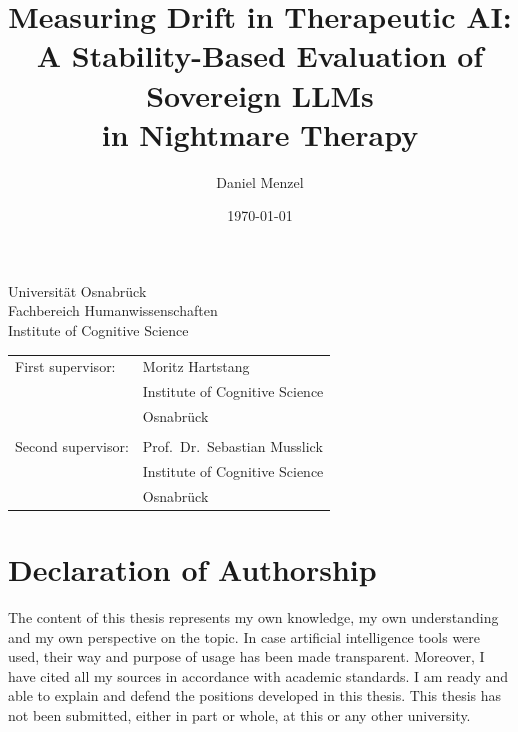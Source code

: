 \documentclass[11pt,
  paper=a4,
  bibliography=totocnumbered,
  captions=tableheading,
  BCOR=10mm
]{scrreprt}
\title{Measuring Drift in Therapeutic AI:\\A Stability-Based Evaluation of Sovereign LLMs\\in Nightmare Therapy}
\author{Daniel Menzel}
\date{\today}
\begin{document}
\begin{titlepage}
  \begin{flushleft}
    Universit\"at Osnabr\"uck\\
    Fachbereich Humanwissenschaften\\
    Institute of Cognitive Science
  \end{flushleft}

  \vspace{2cm}
  \vspace{1cm}

  \begin{tabular}{ll}
    First supervisor:  & Moritz Hartstang                \\
                       & Institute of Cognitive Science  \\
                       & Osnabr\"uck                     \\\\
    Second supervisor: & Prof.\ Dr.\ Sebastian Musslick  \\
                       & Institute of Cognitive Science  \\
                       & Osnabr\"uck
  \end{tabular}

\end{titlepage}


\chapter*{Declaration of Authorship}
The content of this thesis represents my own knowledge, my own understanding and my own perspective on the topic.
In case artificial intelligence tools were used, their way and purpose of usage has been made transparent.
Moreover, I have cited all my sources in accordance with academic standards.
I am ready and able to explain and defend the positions developed in this thesis.
This thesis has not been submitted, either in part or whole, at this or any other university.
\end{document}
